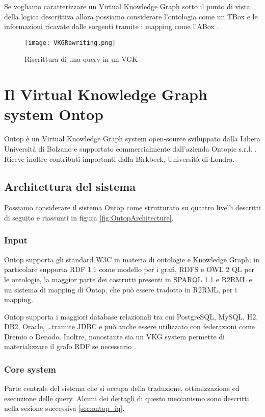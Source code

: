 Se vogliamo caratterizzare un Virtual Knowledge Graph sotto il punto di vista della logica descrittiva allora possiamo considerare l'ontologia come un TBox e le informazioni ricavate dalle sorgenti 
tramite i mapping come l'ABox \cite{OBDA} \cite{VKGOverview}. 


\begin{figure}[ht]
    \centering
    \texttt{[image: VKGRewriting.png]}
    \caption{Riscrittura di una query in un VGK \cite{VKGOverview}}
    \label{fig:VKGRewriting}
\end{figure}


\section{Il Virtual Knowledge Graph system Ontop}
\label{sec:vkg_ontop}
Ontop è un Virtual Knowledge Graph system open-source sviluppato dalla Libera Università di Bolzano e supportato commercialmente dall'azienda Ontopic s.r.l. . 
Riceve inoltre contributi importanti dalla Birkbeck, Università di Londra.

\subsection{Architettura del sistema}
Possiamo considerare il sistema Ontop come strutturato su quattro livelli descritti di seguito e riassunti in figura \ref{fig:OntopArchitecture}.
\subsubsection*{Input}
Ontop supporta gli standard W3C in materia di ontologie e Knowledge Graph; in particolare supporta RDF 1.1 come modello per i grafi, RDFS e OWL 2 QL per le
ontologie, la maggior parte dei costrutti presenti in SPARQL 1.1 e R2RML e un sistema di mapping di Ontop, che può essere tradotto in R2RML, per i mapping.

Ontop supporta i maggiori database relazionali tra cui PostgreSQL, MySQL, H2, DB2, Oracle, \dots tramite JDBC e può anche essere utilizzato con federazioni come 
Dremio o Denodo. Inoltre, nonostante sia un VKG system permette di materializzare il grafo RDF se necessario \cite{OntopArchitecture}.

\subsubsection*{Core system}
Parte centrale del sistema che si occupa della traduzione, ottimizzazione ed esecuzione delle query. Alcuni dei dettagli di questo meccanismo sono descritti nella
sezione successiva \ref{sec:ontop_iq}.
